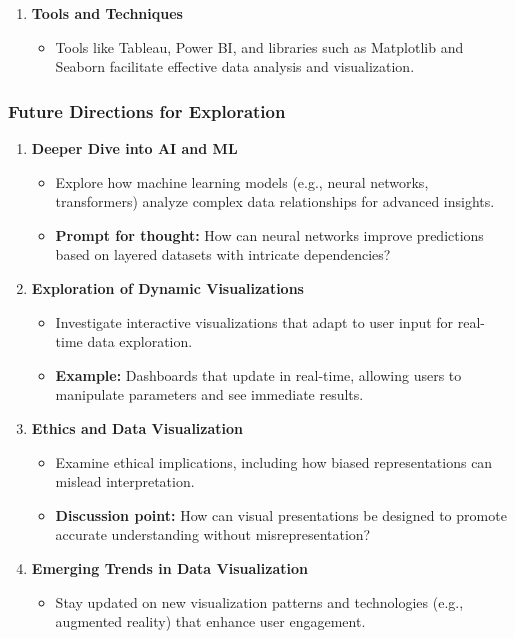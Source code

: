 \documentclass[aspectratio=169]{beamer}
\begin{document}
\begin{frame}[fragile]
\begin{enumerate}
        \item \textbf{Tools and Techniques}  
            \begin{itemize}
                \item Tools like Tableau, Power BI, and libraries such as Matplotlib and Seaborn facilitate effective data analysis and visualization.
            \end{itemize}
    \end{enumerate}
\end{frame}

\begin{frame}[fragile]
    \frametitle{Future Directions for Exploration}
    
    \begin{enumerate}
        \item \textbf{Deeper Dive into AI and ML}  
            \begin{itemize}
                \item Explore how machine learning models (e.g., neural networks, transformers) analyze complex data relationships for advanced insights.
                \item \textbf{Prompt for thought:} How can neural networks improve predictions based on layered datasets with intricate dependencies?
            \end{itemize}
        
        \item \textbf{Exploration of Dynamic Visualizations}  
            \begin{itemize}
                \item Investigate interactive visualizations that adapt to user input for real-time data exploration.
                \item \textbf{Example:} Dashboards that update in real-time, allowing users to manipulate parameters and see immediate results.
            \end{itemize}
        
        \item \textbf{Ethics and Data Visualization}  
            \begin{itemize}
                \item Examine ethical implications, including how biased representations can mislead interpretation.
                \item \textbf{Discussion point:} How can visual presentations be designed to promote accurate understanding without misrepresentation?
            \end{itemize}
        
        \item \textbf{Emerging Trends in Data Visualization}  
            \begin{itemize}
                \item Stay updated on new visualization patterns and technologies (e.g., augmented reality) that enhance user engagement.
            \end{itemize}
    \end{enumerate}
\end{frame}
\end{document}
